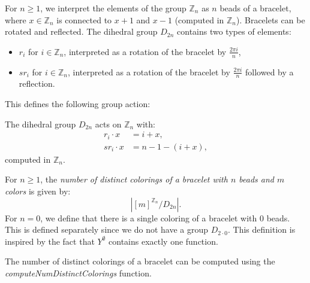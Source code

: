 For $n \geq 1$, we interpret the elements of the group $\mathbb{Z}_n$ as $n$ beads of a bracelet, where $x \in \mathbb{Z}_n$ is connected to $x + 1$ and $x - 1$ (computed in $\mathbb{Z}_n$). Bracelets can be rotated and reflected. The dihedral group $D_{2n}$ contains two types of elements:
\begin{itemize}
  \item $r_i$ for $i \in \mathbb{Z}_n$, interpreted as a rotation of the bracelet by $\frac{2\pi i}{n}$,
  \item $sr_i$ for $i \in \mathbb{Z}_n$, interpreted as a rotation of the bracelet by $\frac{2\pi i}{n}$ followed by a reflection.
\end{itemize}
This defines the following group action:

\begin{definition}
  \label{def:MulActionBracelet}
  \leanok
  The dihedral group $D_{2n}$ acts on $\mathbb{Z}_n$ with:
  \begin{align*}
    r_i \cdot x &= i + x, \\
    sr_i \cdot x &= n - 1 - (i + x),
  \end{align*}
  computed in $\mathbb{Z}_n$.
\end{definition}

\begin{definition}
  \label{def:numDistinctColoringsOfBracelet}
  \leanok
  For $n \geq 1$, the \emph{number of distinct colorings of a bracelet with $n$ beads and $m$ colors} is given by:
  \begin{equation*}
    |[m]^{\mathbb{Z}_n}/D_{2n}|.
  \end{equation*}
  For $n = 0$, we define that there is a single coloring of a bracelet with $0$ beads. This is defined separately since we do not have a group $D_{2\cdot0}$. This definition is inspired by the fact that $Y^\emptyset$ contains exactly one function.
\end{definition}

\begin{proposition}
  \label{prop:computeNumDistinctColoringsOfBracelet-eq-numDistinctColoringsOfBracelet}
  \leanok
  The number of distinct colorings of a bracelet can be computed using the \emph{computeNumDistinctColorings} function.
\end{proposition}

